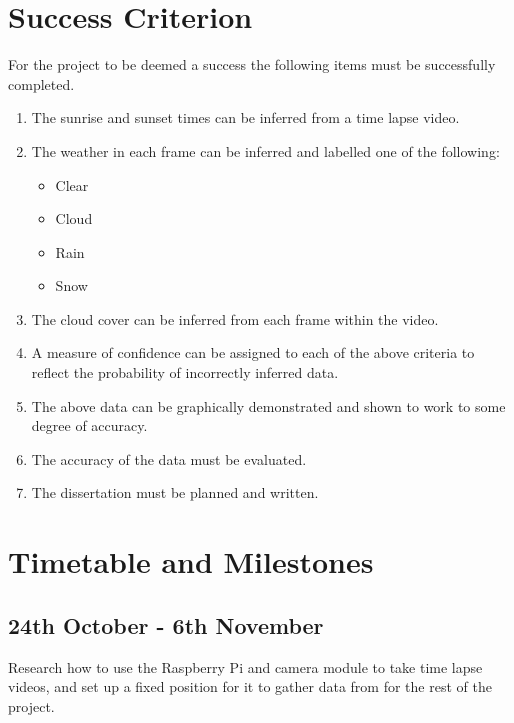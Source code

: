 \documentclass[12pt]{article}
\begin{document}
\section*{Success Criterion}

For the project to be deemed a success the following items must be
successfully completed.

\begin{enumerate}

\item The sunrise and sunset times can be inferred from a time lapse video.

\item The weather in each frame can be inferred and labelled one of the following:
	\begin{itemize}
		\item Clear
		\item Cloud
		\item Rain
		\item Snow
	\end{itemize}
	
\item The cloud cover can be inferred from each frame within the video.

\item A measure of confidence can be assigned to each of the above criteria to reflect the probability of incorrectly inferred data.

\item The above data can be graphically demonstrated and shown to work to some degree of accuracy.

\item The accuracy of the data must be evaluated.

\item The dissertation must be planned and written.

\end{enumerate}

\section*{Timetable and Milestones}

\subsection*{24th October - 6th November}%

Research how to use the Raspberry Pi and camera module to take time lapse videos, and set up a fixed position for it to gather data from for the rest of the project.
\end{document}
